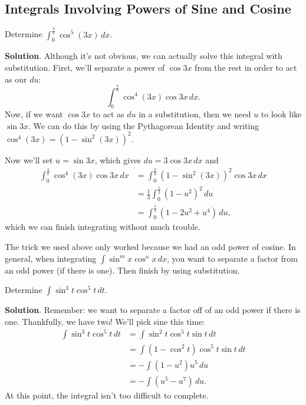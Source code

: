 \documentclass[10pt,]{book}
\theoremstyle{ptxplainnotitle}
\theoremstyle{ptxplaintitle}
\theoremstyle{ptxplainnotitle}
\theoremstyle{ptxplaintitle}
\theoremstyle{ptxplainnotitle}
\theoremstyle{ptxplaintitle}
\theoremstyle{ptxdefinitionnotitle}
\theoremstyle{ptxdefinitiontitle}
\theoremstyle{ptxdefinitionnotitle}
\theoremstyle{ptxdefinitiontitle}
\theoremstyle{ptxdefinitionnotitle}
\theoremstyle{ptxdefinitiontitle}
\theoremstyle{ptxdefinitionnotitle}
\theoremstyle{ptxdefinitiontitle}
\theoremstyle{ptxdefinitionnotitle}
\theoremstyle{ptxdefinitiontitle}
\numberwithin{equation}{section}
\begin{document}
\subsection[{Integrals Involving Powers of Sine and Cosine}]{Integrals Involving Powers of Sine and Cosine}\label{subsection-integrals-involving-powers-of-sine-and-cosine}
\begin{example}\label{example-integrating-an-odd-power-of-cosine}
\hypertarget{p-520}{}%
Determine \(\int_{0}^{\frac{\pi}{6}}\cos^{5}(3x)\,dx\).%
\par\smallskip%
\noindent\textbf{Solution}.\hypertarget{solution-114}{}\quad%
\hypertarget{p-521}{}%
Although it's not obvious, we can actually solve this integral with substitution. First, we'll separate a power of \(\cos3x\) from the rest in order to act as our \(du\):%
\begin{equation*}
\int_{0}^{\frac{\pi}{6}}\cos^{4}(3x)\cos3x\,dx.
\end{equation*}
Now, if we want \(\cos3x\) to act as \(du\) in a substitution, then we need \(u\) to look like \(\sin3x\). We can do this by using the Pythagorean Identity and writing \(\cos^{4}(3x) = (1 - \sin^{2}(3x))^{2}\).%
\par
\hypertarget{p-522}{}%
Now we'll set \(u = \sin3x\), which gives \(du = 3\cos3x\,dx\) and%
%
\begin{align*}
\int_{0}^{\frac{\pi}{6}}\cos^{4}(3x)\cos3x\,dx & = \int_{0}^{\frac{\pi}{6}}(1-\sin^{2}(3x))^{2}\cos3x\,dx \\
& = \frac{1}{3}\int_{0}^{\frac{1}{2}}(1 - u^{2})^{2}\,du \\
& = \int_{0}^{\frac{1}{2}}(1 - 2u^{2} + u^{4})\,du, 
\end{align*}
\hypertarget{p-523}{}%
which we can finish integrating without much trouble.%
\end{example}
\hypertarget{p-524}{}%
The trick we used above only worked because we had an odd power of cosine. In general, when integrating \(\int\sin^{m}x\cos^{n}x\,dx\), you want to separate a factor from an odd power (if there is one). Then finish by using substitution.%
\begin{example}\label{example-odd-powers-of-sine-and-cosine}
\hypertarget{p-525}{}%
Determine \(\int\sin^{3}t\cos^{5}t\,dt\).%
\par\smallskip%
\noindent\textbf{Solution}.\hypertarget{solution-115}{}\quad%
\hypertarget{p-526}{}%
Remember: we want to separate a factor off of an odd power if there is one. Thankfully, we have two! We'll pick sine this time:%
%
\begin{align*}
\int\sin^{3}t\cos^{5}t\,dt & = \int\sin^{2}t\cos^{5}t\sin t\,dt \\
& = \int(1 - \cos^{2}t)\cos^{5}t\sin t\,dt \\
& = -\int(1 - u^{2})u^{5}\,du \\
& = -\int (u^{5} - u^{7})\,du. 
\end{align*}
\hypertarget{p-527}{}%
At this point, the integral isn't too difficult to complete.%
\end{example}
\end{document}
